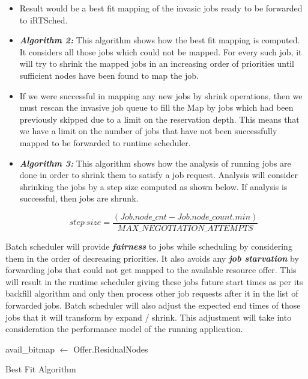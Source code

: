 \begin{itemize}
\item Result would be a best fit mapping of the invasic jobs ready to be forwarded to iRTSched.
\item \textbf{\textit{Algorithm 2:}} This algorithm shows how the best fit mapping is computed. It considers all those jobs which could not be mapped. For every such job, it will try to shrink the mapped jobs in an increasing order of priorities until sufficient nodes have been found to map the job. 
\item If we were successful in mapping any new jobs by shrink operations, then we must rescan the invasive job queue to fill the Map by jobs which had been previously skipped due to a limit on the reservation depth. This means that we have a limit on the number of jobs that have not been successfully mapped to be forwarded to runtime scheduler.
\item \textbf{\textit{Algorithm 3:}} This algorithm shows how the analysis of running jobs are done in order to shrink them to satisfy a job request. Analysis will consider shrinking the jobs by a step size computed as shown below. If analysis is successful, then jobs are shrunk.
\vspace{-0.30in}
\begin{center}
\boldmath\begin{equation*}
step\ size = \frac{(Job.node\_cnt - Job.node\_count.min)}{MAX\_NEGOTIATION\_ATTEMPTS}
\end{equation*}
\end{center}
\end{itemize}
Batch scheduler will provide \textbf{\textit{fairness}} to jobs while scheduling by considering them in the order of decreasing priorities. It also avoids any \textbf{\textit{job starvation}} by forwarding jobs that could not get mapped to the available resource offer. This will result in the runtime scheduler giving these jobs future start times as per its backfill algorithm and only then process other job requests after it  in the list of forwarded jobs. Batch scheduler will also adjust the expected end times of those jobs that it will transform by expand / shrink. This adjustment will take into consideration the performance model of the running application.
\setcounter{AlgoLine}{0}
\begin{algorithm}[!htbp]
 \DontPrintSemicolon
 avail\_bitmap $\leftarrow$ Offer.ResidualNodes\;
 \caption{Best Fit Algorithm}
\end{algorithm}
